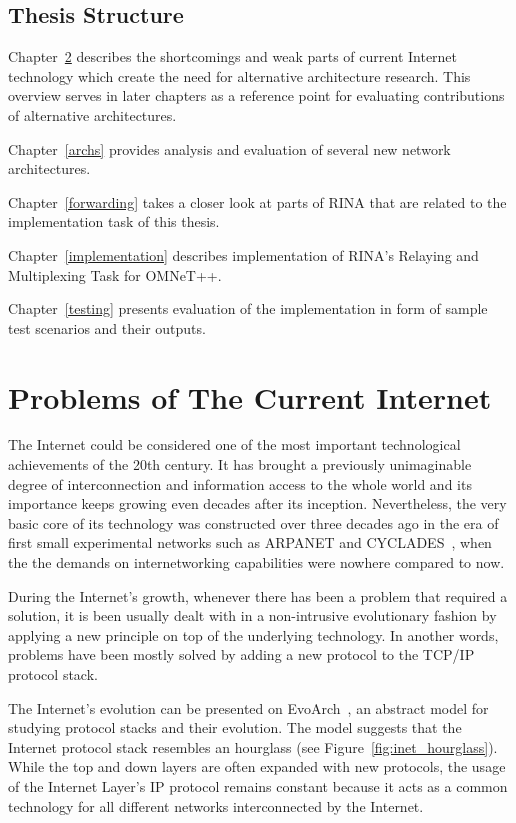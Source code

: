     \section{Thesis Structure}

        Chapter~\ref{problems} describes the shortcomings and weak parts of current Internet technology which create the need for alternative architecture research. This overview serves in later chapters as a reference point for evaluating contributions of alternative architectures.

        Chapter~\ref{archs} provides analysis and evaluation of several new network architectures.

        Chapter~\ref{forwarding} takes a closer look at parts of RINA that are related to the implementation task of this thesis.

        Chapter~\ref{implementation} describes implementation of RINA's Relaying and Multiplexing Task for OMNeT++.

        Chapter~\ref{testing} presents evaluation of the implementation in form of sample test scenarios and their outputs.


\chapter{Problems of The Current Internet}\label{problems}

    The Internet could be considered one of the most important technological achievements of the 20th century. It has brought a previously unimaginable degree of interconnection and information access to the whole world and its importance keeps growing even decades after its inception. Nevertheless, the very basic core of its technology was constructed over three decades ago in the era of first small experimental networks such as ARPANET and CYCLADES~\cite{Kurose}, when the the demands on internetworking capabilities were nowhere compared to now.

    During the Internet's growth, whenever there has been a problem that required a solution, it is been usually dealt with in a non-intrusive evolutionary fashion by applying a new principle on top of the underlying technology. In another words, problems have been mostly solved by adding a new protocol to the TCP/IP protocol stack.

    The Internet's evolution can be presented on EvoArch~\cite{EvoArch}, an abstract model for studying protocol stacks and their evolution. The model suggests that the Internet protocol stack resembles an hourglass (see Figure~\ref{fig:inet_hourglass}). While the top and down layers are often expanded with new protocols, the usage of the Internet Layer's IP protocol remains constant because it acts as a common technology for all different networks interconnected by the Internet.

